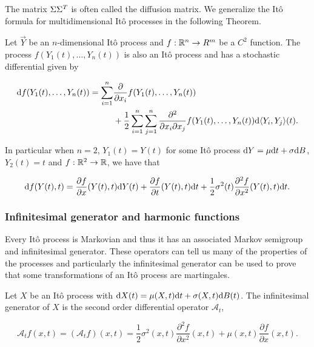 The matrix $\Sigma \Sigma^T$ is often called the diffusion matrix. We generalize the Itô formula for multidimensional Itô processes in the following Theorem.

\begin{theorem}
    Let $\vec Y $ be an $n$-dimensional Itô process and $f: \mathbb R^n \to R^m$ be a $C^2$ function. The process $f(Y_1(t), \dots, Y_n(t))$ is also an Itô process and has a stochastic differential given by

    \begin{align*}
        \mathrm d f(Y_1(t), \dots, Y_n(t)) = \sum_{i=1}^n &\frac{\partial}{\partial x_i} f(Y_1(t), \dots, Y_n(t))\\  
        &+ \frac12 \sum_{i=1}^n \sum_{j=1}^n \frac{\partial^2}{\partial x_i\partial x_j} f(Y_1(t), \dots, Y_n(t)) \mathrm d \langle Y_i, Y_j\rangle (t).
    \end{align*}
\end{theorem}

In particular when $n=2$, $Y_1(t) = Y(t)$ for some Itô process $\mathrm d Y = \mu \mathrm d t + \sigma \mathrm d B$, $Y_2(t) = t$ and $f:\mathbb R^2 \to \mathbb R$, we have that

\begin{equation} \label{eq:ito_2var}
    \mathrm d f(Y(t),t) = \frac{\partial f}{\partial x} (Y(t),t) \mathrm d Y(t) + \frac{\partial f}{\partial t} (Y(t),t) \mathrm d t + \frac12 \sigma^2(t)\frac{\partial^2f}{\partial x^2} (Y(t),t) \mathrm d t.
\end{equation}


\subsubsection{Infinitesimal generator and harmonic functions}

Every Itô process is Markovian and thus it has an associated Markov semigroup and infinitesimal generator. These operators can tell us many of the properties of the processes and particularly the infinitesimal generator can be used to prove that some transformations of an Itô process are martingales.

\begin{definition}
    Let $X$ be an Itô process with $\mathrm d X(t) = \mu(X,t) \mathrm d t + \sigma(X,t) \mathrm d B(t)$. The infinitesimal generator  of $X$ is the second order differential operator $\mathcal A_t$,

    \begin{equation*}
        \mathcal A_t f(x,t) = (\mathcal A_t f)(x,t) = \frac12 \sigma^2(x,t) \frac{\partial^2 f}{\partial x^2} (x,t) + \mu(x,t)\frac{\partial f}{\partial x}(x,t).
    \end{equation*}
\end{definition}

